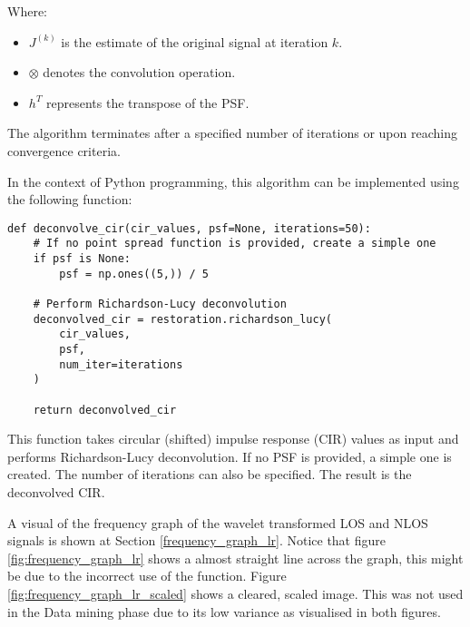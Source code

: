 Where:
\begin{itemize}
    \item $J^{(k)}$ is the estimate of the original signal at iteration $k$.
    \item $\otimes$ denotes the convolution operation.
    \item $h^T$ represents the transpose of the PSF. 
\end{itemize}


The algorithm terminates after a specified number of iterations or upon reaching convergence criteria.

In the context of Python programming, this algorithm can be implemented using the following function:

\begin{verbatim}
def deconvolve_cir(cir_values, psf=None, iterations=50):
    # If no point spread function is provided, create a simple one
    if psf is None:
        psf = np.ones((5,)) / 5

    # Perform Richardson-Lucy deconvolution
    deconvolved_cir = restoration.richardson_lucy(
        cir_values, 
        psf, 
        num_iter=iterations
    )

    return deconvolved_cir
\end{verbatim}

This function takes circular (shifted) impulse response (CIR) values as input and performs Richardson-Lucy deconvolution. If no PSF is provided, a simple one is created. The number of iterations can also be specified. The result is the deconvolved CIR.

A visual of the frequency graph of the wavelet transformed LOS and NLOS signals is shown at Section \ref{frequency_graph_lr}. Notice that figure \ref{fig:frequency_graph_lr} shows a almost straight line across the graph, this might be due to the incorrect use of the function. Figure \ref{fig:frequency_graph_lr_scaled} shows a cleared, scaled image. This was not used in the Data mining phase due to its low variance as visualised in both figures.
